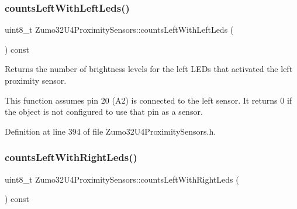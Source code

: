 \mbox{\label{class_zumo32_u4_proximity_sensors_adb60bbaa2fffc19cfe783bf5a2ff4161}} 
\subsubsection{\texorpdfstring{counts\+Left\+With\+Left\+Leds()}{countsLeftWithLeftLeds()}}
{\footnotesize\ttfamily uint8\+\_\+t Zumo32\+U4\+Proximity\+Sensors\+::counts\+Left\+With\+Left\+Leds (\begin{DoxyParamCaption}{ }\end{DoxyParamCaption}) const\hspace{0.3cm}{\ttfamily [inline]}}



Returns the number of brightness levels for the left L\+E\+Ds that activated the left proximity sensor. 

This function assumes pin 20 (A2) is connected to the left sensor. It returns 0 if the object is not configured to use that pin as a sensor. 

Definition at line 394 of file Zumo32\+U4\+Proximity\+Sensors.\+h.

\mbox{\label{class_zumo32_u4_proximity_sensors_aaa0bcd5ab03cc2b7c26710cccc9114de}} 
\subsubsection{\texorpdfstring{counts\+Left\+With\+Right\+Leds()}{countsLeftWithRightLeds()}}
{\footnotesize\ttfamily uint8\+\_\+t Zumo32\+U4\+Proximity\+Sensors\+::counts\+Left\+With\+Right\+Leds (\begin{DoxyParamCaption}{ }\end{DoxyParamCaption}) const\hspace{0.3cm}{\ttfamily [inline]}}



